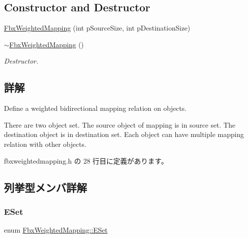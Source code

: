 \subsection*{Constructor and Destructor}
\begin{DoxyCompactItemize}
\item 
\hyperlink{class_fbx_weighted_mapping_a2ba4f4ee1f96910ed1931d83eee5fcaa}{Fbx\+Weighted\+Mapping} (int p\+Source\+Size, int p\+Destination\+Size)
\item 
\hyperlink{class_fbx_weighted_mapping_a30ea1b9d4a140bb8689c01619b5a0e93}{$\sim$\+Fbx\+Weighted\+Mapping} ()
\begin{DoxyCompactList}\small\item\em Destructor. \end{DoxyCompactList}\end{DoxyCompactItemize}


\subsection{詳解}
Define a weighted bidirectional mapping relation on objects.

There are two object set. The source object of mapping is in source set. The destination object is in destination set. Each object can have multiple mapping relation with other objects. 

 fbxweightedmapping.\+h の 28 行目に定義があります。



\subsection{列挙型メンバ詳解}
\mbox{\label{class_fbx_weighted_mapping_a3fb59c162b0c5b278f00e7bad4c578c6}} 
\subsubsection{\texorpdfstring{E\+Set}{ESet}}
{\footnotesize\ttfamily enum \hyperlink{class_fbx_weighted_mapping_a3fb59c162b0c5b278f00e7bad4c578c6}{Fbx\+Weighted\+Mapping\+::\+E\+Set}}

